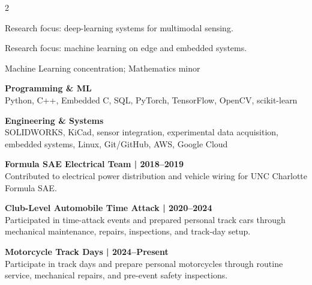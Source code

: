 \documentclass[9pt,letterpaper,ragged2e,withhyper]{../asset/altacv}
\newcommand{\compactdivider}{%
  \par\noindent\textcolor{body!30}{\hdashrule{\linewidth}{0.4pt}{0.5ex}}\par
}
\begin{document}
\begin{paracol}{2}
\vfill
{}

\small Research focus: deep-learning systems for multimodal sensing.

\divider

\small Research focus: machine learning on edge and embedded systems.

\divider

\small Machine Learning concentration; Mathematics minor

\vfill
{}

\textbf{Programming \& ML}\\
Python, C++, Embedded C, SQL, PyTorch, TensorFlow, OpenCV, scikit-learn

\compactdivider
\textbf{Engineering \& Systems}\\
SOLIDWORKS, KiCad, sensor integration, experimental data acquisition, embedded systems, Linux, Git/GitHub, AWS, Google Cloud

\vfill
{}

\textbf{Formula SAE Electrical Team | 2018--2019}\\
Contributed to electrical power distribution and vehicle wiring for UNC Charlotte Formula SAE.

\compactdivider
\textbf{Club-Level Automobile Time Attack | 2020--2024}\\
Participated in time-attack events and prepared personal track cars through mechanical maintenance, repairs, inspections, and track-day setup.

\compactdivider
\textbf{Motorcycle Track Days | 2024--Present}\\
Participate in track days and prepare personal motorcycles through routine service, mechanical repairs, and pre-event safety inspections.

\end{paracol}





\end{document}
